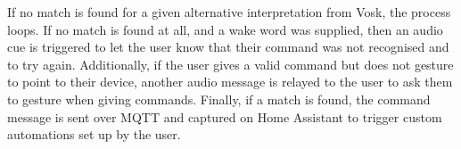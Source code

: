 If no match is found for a given alternative interpretation from Vosk, the process loops.
If no match is found at all, and a wake word was supplied, then an audio cue is triggered to let the user know that their command was not recognised and to try again.
Additionally, if the user gives a valid command but does not gesture to point to their device, another audio message is relayed to the user to ask them to gesture when giving commands.
Finally, if a match is found, the command message is sent over MQTT and captured on Home Assistant to trigger custom automations set up by the user.